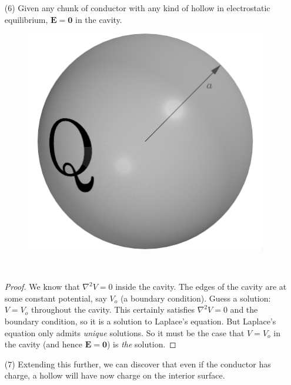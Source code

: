 \documentclass{article}
\begin{document}
\begin{enumerate}

\item[(6)] Given any chunk of conductor with any kind of hollow in electrostatic equilibrium, $\bm{E} = \bm{0}$ in the cavity.

\begin{minipage}{0.3\textwidth}
\begin{figure}[H]
\centering
    \includegraphics[width=\textwidth]{figures/6l2.png}
\end{figure}
\end{minipage}
~
\begin{minipage}{0.6\textwidth}
\begin{proof}
We know that $\displaystyle \nabla^2 V = 0$ inside the cavity. The edges of the cavity are at some constant potential, say $V_o$ (a boundary condition).
\vspace{1em}
Guess a solution: $V = V_o$ throughout the cavity. This certainly satisfies $\nabla^2 V = 0$ and the boundary condition, so it is a solution to Laplace's equation. But Laplace's equation only admits \emph{unique} solutions. So it must be the case that $V = V_o$ in the cavity (and hence $\bm{E} = \bm{0}$) is \emph{the} solution.
\end{proof}
\end{minipage}

\item[(7)] Extending this further, we can discover that even if the conductor has charge, a hollow will have now charge on the interior surface.

\end{enumerate}
\end{document}

